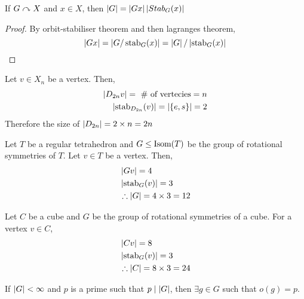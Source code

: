 \documentclass{article}
\begin{document}

\begin{cor}
    If $G \curvearrowright X$ and $x \in X$, then $\left\lvert G\right\rvert = \left\lvert Gx\right\rvert \left\lvert Stab_G(x)\right\rvert$
\end{cor}

\begin{proof}
    By orbit-stabiliser theorem and then lagranges theorem, 
    \[
        \left\lvert Gx\right\rvert = \left\lvert G \slash \operatorname{stab}_G(x)\right\rvert = \left\lvert G\right\rvert \slash \left\lvert \operatorname{stab}_G(x)\right\rvert
    \]
\end{proof}

\begin{eg}[$D_{2n} \gact X_n$]
    Let $v \in X_n$ be a vertex. Then,
    \begin{align*}
        \left\lvert D_{2n}v\right\rvert = \ \text{\# of vertecies} = n \\
        \left\lvert \operatorname{stab}_{D_{2n}}(v)\right\rvert = \left\lvert \{e, s\}\right\rvert = 2
    \end{align*}
    Therefore the size of $\left\lvert D_{2n}\right\rvert = 2 \times n = 2n$
\end{eg}

\begin{eg}[Tetrahedron]
    Let $T$ be a regular tetrahedron and $G \leq \operatorname{Isom}(T)$ be the group of rotational symmetries of $T$. Let $v \in T$ be a vertex. Then,
    \begin{align*}
        &\left\lvert Gv\right\rvert = 4 \\
        &\left\lvert \operatorname{stab}_{G}(v)\right\rvert = 3 \\
        &\therefore \left\lvert G\right\rvert = 4 \times 3 = 12
    \end{align*}
\end{eg}

\begin{eg}[Cube]
    Let $C$ be a cube and $G$ be the group of rotational symmetries of a cube. For a vertex $v \in C$,
    \begin{align*}
        &\left\lvert Cv\right\rvert = 8 \\
        &\left\lvert \operatorname{stab}_{G}(v)\right\rvert = 3 \\
        &\therefore \left\lvert C\right\rvert = 8 \times 3 = 24
    \end{align*}
\end{eg}

\begin{ex}
\end{ex}

\begin{thm}
    If $\left\lvert G\right\rvert < \infty$ and $p$ is a prime such that $p \mid \left\lvert G\right\rvert$, then $\exists g \in G$ such that $o(g) = p$.
\end{thm}
\end{document}
